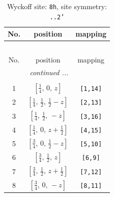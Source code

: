 \documentclass[fleqn,8pt]{jsarticle}
\begin{document}
\begin{longtable}{ccc}
\caption{Wyckoff site: {\tt 8h}, site symmetry: {\tt ..2'}}
 \\
 \hline \hline
No. & position & mapping \\ \hline \endfirsthead

\multicolumn{2}{l}{\tablename\ \thetable{}} \\
 \hline \hline
No. & position & mapping \\ \hline \endhead

 \hline \hline
\multicolumn{2}{r}{\footnotesize\it continued ...} \\ \endfoot

 \hline \hline
\multicolumn{2}{r}{} \\ \endlastfoot

1 & $\left[ \frac{1}{4},\, 0,\, z \right]$ & {\tt [1,14]} \\ \hline
2 & $\left[ \frac{1}{4},\, \frac{1}{2},\, \frac{1}{2} - z \right]$ & {\tt [2,13]} \\ \hline
3 & $\left[ \frac{1}{4},\, \frac{1}{2},\, - z \right]$ & {\tt [3,16]} \\ \hline
4 & $\left[ \frac{1}{4},\, 0,\, z + \frac{1}{2} \right]$ & {\tt [4,15]} \\ \hline
5 & $\left[ \frac{3}{4},\, 0,\, \frac{1}{2} - z \right]$ & {\tt [5,10]} \\ \hline
6 & $\left[ \frac{3}{4},\, \frac{1}{2},\, z \right]$ & {\tt [6,9]} \\ \hline
7 & $\left[ \frac{3}{4},\, \frac{1}{2},\, z + \frac{1}{2} \right]$ & {\tt [7,12]} \\ \hline
8 & $\left[ \frac{3}{4},\, 0,\, - z \right]$ & {\tt [8,11]} \\
\end{longtable}
\renewcommand{\arraystretch}{1.2}
\end{document}
